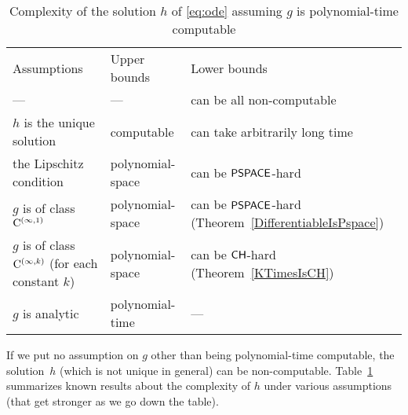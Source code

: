 \begin{table}
\renewcommand\arraystretch{1.5}
\begin{center}
 \caption{Complexity of the solution $h$ of \eqref{eq:ode}
 assuming $g$ is polynomial-time computable}
 \label{table:related}
\small\vspace{3pt}
 \begin{tabular}{lll}
  Assumptions & Upper bounds & Lower bounds \\
  \noalign{\smallskip}
  \hline
  \noalign{\smallskip}
  --- &
      --- &
	  can be all non-computable \cite{pour1979computable} 
  \\
  $h$ is the unique solution & 
      computable \cite{coddington1955theory} & 
	  \parbox[t]{13em}{can take arbitrarily long time\\
                           \cite{ko1983computational,miller1970recursive}} 
  \\
  the Lipschitz condition  &
      polynomial-space \cite{ko1983computational} &
	  can be $\mathsf{PSPACE}$-hard \cite{kawamura2010lipschitz}
  \\
  $g$ is of class $\mathrm C ^{(\infty, 1)}$ & 
      polynomial-space &
	  \parbox[t]{12em}{can be $\mathsf{PSPACE}$-hard\\
                           (Theorem~\ref{DifferentiableIsPspace})} 
  \\
  \parbox[t]{10.55em}{$g$ is of class $\mathrm C ^{(\infty, k)}$\\
  {}(for each constant $k$)} &
      polynomial-space &
	  can be $\mathsf{CH}$-hard (Theorem~\ref{KTimesIsCH}) 
  \\
  $g$ is analytic &
      \parbox[t]{8em}{polynomial-time \\
      \cite{muller1987uniform,ko1988computing,kawamura2010complexity} } &
           ---
 \end{tabular}
\end{center}
\end{table}

If we put no assumption on $g$ other than being polynomial-time computable, 
the solution~$h$ (which is not unique in general) can be non-computable. 
Table~\ref{table:related} summarizes known results about 
the complexity of $h$ under various assumptions 
(that get stronger as we go down the table). 

